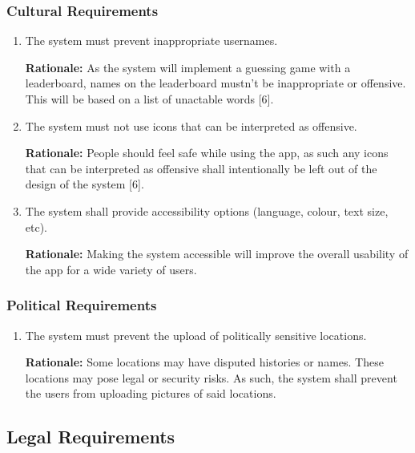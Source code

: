 \documentclass[]{article}
\begin{document}
\subsubsection{Cultural Requirements}
\label{ssub:cultural_requirements}
\begin{enumerate}[{CP-C}1. ]
	\item The system must prevent inappropriate usernames. 

    {\bf Rationale:} As the system will implement a guessing game with a leaderboard, names on the leaderboard mustn't be inappropriate or offensive. This will be based on a list of unactable words [6].
    \item The system must not use icons that can be interpreted as offensive. 

    {\bf Rationale:} People should feel safe while using the app, as such any icons that can be interpreted as offensive shall intentionally be left out of the design of the system [6].
    \item The system shall provide accessibility options (language, colour, text size, etc). 

    {\bf Rationale:} Making the system accessible will improve the overall usability of the app for a wide variety of users.
\end{enumerate}

\subsubsection{Political Requirements}
\label{ssub:political_requirements}
\begin{enumerate}[{CP-P}1. ]
	\item The system must prevent the upload of politically sensitive locations. 

    {\bf Rationale:} Some locations may have disputed histories or names. These locations may pose legal or security risks. As such, the system shall prevent the users from uploading pictures of said locations.
\end{enumerate}


\subsection{Legal Requirements}
\label{sub:legal_requirements}
\end{document}
